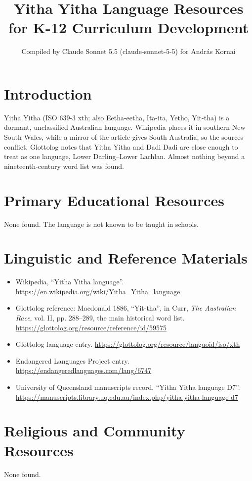 \documentclass[12pt]{article}
\title{Yitha Yitha Language Resources for K-12 Curriculum Development}
\author{Compiled by Claude Sonnet 5.5 (claude-sonnet-5-5) for Andr\'as Kornai}
\date{}
\begin{document}
\maketitle

\section{Introduction}
Yitha Yitha (ISO 639-3 xth; also Eetha-eetha, Ita-ita, Yetho, Yit-tha) is a dormant, unclassified Australian language. Wikipedia places it in southern New South Wales, while a mirror of the article gives South Australia, so the sources conflict. Glottolog notes that Yitha Yitha and Dadi Dadi are close enough to treat as one language, Lower Darling--Lower Lachlan. Almost nothing beyond a nineteenth-century word list was found.

\section{Primary Educational Resources}
None found. The language is not known to be taught in schools.

\section{Linguistic and Reference Materials}
\begin{itemize}
\item Wikipedia, ``Yitha Yitha language''. \url{https://en.wikipedia.org/wiki/Yitha_Yitha_language}
\item Glottolog reference: Macdonald 1886, ``Yit-tha'', in Curr, \textit{The Australian Race}, vol. II, pp. 288--289, the main historical word list. \url{https://glottolog.org/resource/reference/id/59575}
\item Glottolog language entry. \url{https://glottolog.org/resource/languoid/iso/xth}
\item Endangered Languages Project entry. \url{https://endangeredlanguages.com/lang/6747}
\item University of Queensland manuscripts record, ``Yitha Yitha language D7''. \url{https://manuscripts.library.uq.edu.au/index.php/yitha-yitha-language-d7}
\end{itemize}

\section{Religious and Community Resources}
None found.
\end{document}
